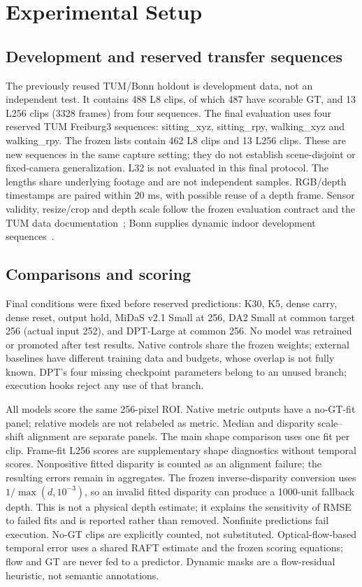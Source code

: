 \documentclass[mathematics,article,submit,moreauthors]{Definitions/mdpi}
\begin{document}
\section{Experimental Setup}
\subsection{Development and reserved transfer sequences}
The previously reused TUM/Bonn holdout is development data, not an independent test.
It contains 488 L8 clips, of which 487 have scorable GT, and 13 L256 clips (3328 frames)
from four sequences. The final evaluation uses four reserved TUM Freiburg3 sequences:
sitting\_xyz, sitting\_rpy, walking\_xyz and walking\_rpy. The frozen lists contain
462 L8 clips and 13 L256 clips. These are new sequences in the same capture setting;
they do not establish scene-disjoint or fixed-camera generalization. L32 is not evaluated
in this final protocol. The lengths share underlying footage and are not independent samples.
RGB/depth timestamps are paired within 20 ms, with possible reuse of a depth frame.
Sensor validity, resize/crop and depth scale follow the frozen evaluation contract and
the TUM data documentation~\cite{tumdata}; Bonn supplies dynamic indoor development
sequences~\cite{bonndata}.

\subsection{Comparisons and scoring}
Final conditions were fixed before reserved predictions: K30, K5, dense carry, dense reset,
output hold, MiDaS v2.1 Small at 256, DA2 Small at common target 256 (actual input 252),
and DPT-Large at common 256. No model was retrained or promoted after test results.
Native controls share the frozen weights; external baselines have different training
data and budgets, whose overlap is not fully known. DPT's four missing checkpoint
parameters belong to an unused branch; execution hooks reject any use of that branch.

All models score the same 256-pixel ROI. Native metric outputs have a no-GT-fit panel;
relative models are not relabeled as metric. Median and disparity scale--shift alignment
are separate panels. The main shape comparison uses one fit per clip. Frame-fit L256
scores are supplementary shape diagnostics without temporal scores. Nonpositive fitted
disparity is counted as an alignment failure; the resulting errors remain in aggregates.
The frozen inverse-disparity conversion uses $1/\max(d,10^{-3})$, so an invalid
fitted disparity can produce a 1000-unit fallback depth. This is not a physical depth
estimate; it explains the sensitivity of RMSE to failed fits and is reported rather than removed.
Nonfinite predictions fail execution. No-GT clips are explicitly counted, not substituted.
Optical-flow-based temporal error uses a shared RAFT estimate and the frozen scoring
equations; flow and GT are never fed to a predictor. Dynamic masks are a flow-residual
heuristic, not semantic annotations.
\end{document}
